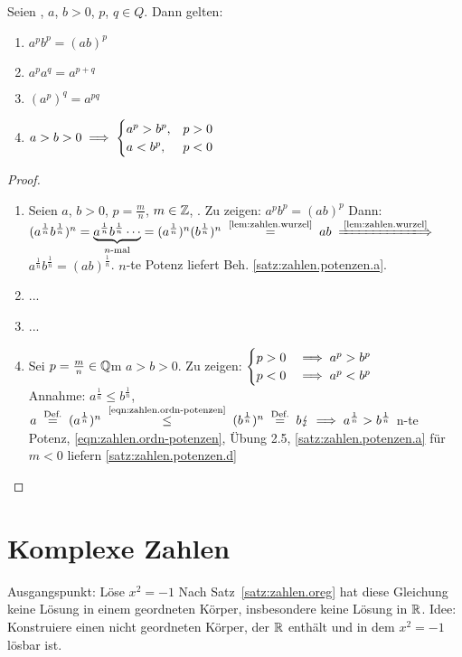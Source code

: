 \documentclass[12pt]{scrreprt}
\begin{document}
\begin{satz}\label{satz:zahlen.potenzen}
Seien , $a$, $b > 0$, $p$, $q \in {Q}$. Dann gelten:
\begin{enumerate}
\item \label{satz:zahlen.potenzen.a}
$a^p b^p = (ab)^p$
\item \label{satz:zahlen.potenzen.b}
$a^p a^q = a^{p+q}$
\item \label{satz:zahlen.potenzen.c}
$(a^p)^q = a^{pq}$
\item \label{satz:zahlen.potenzen.d}\vspace{-0.7\baselineskip}
$a>b>0 \implies \begin{cases}
a^p>b^p, &p>0\\
a<b^p, &p<0
\end{cases}$
\end{enumerate}
\end{satz}
\begin{proof}
\begin{enumerate}
\item Seien $a$, $b >0$, $p = \frac{m}{n}$, $m \in \mathbb{Z}$, .
Zu zeigen: $a^p b^p = (ab)^p$ Dann: $(a^{\frac{1}{n}}b^{\frac{1}{n}})^n =
\underbrace{a^{\frac{1}{n}}b^{\frac{1}{n}}\dotsm}_{n\text{-mal}} =
(a^{\frac{1}{n}})^n (b^{\frac{1}{n}})^n \nach{=}{\ref{lem:zahlen.wurzel}} ab \folgtnach{\ref{lem:zahlen.wurzel}} $
$a^{\frac{1}{n}}b^{\frac{1}{n}} = (ab)^{\frac{1}{n}}$. $n$-te Potenz liefert Beh. \ref{satz:zahlen.potenzen.a}.
\item ...
\item ...
\item Sei $p = \frac{m}{n} \in \mathbb{Q}$m $a>b>0$. Zu zeigen: 
$\begin{cases}
p>0 &\implies a^p > b^p\\
p<0 &\implies a^p < b^p
\end{cases}$\\
Annahme: $a^\frac{1}{n} \le b^\frac{1}{n}$, 
$a \nach{=}{Def.} (a^\frac{1}{n})^n \nach{\le}{\ref{eqn:zahlen.ordn-potenzen}} (b^\frac{1}{n})^n \nach{=}{Def.} b 
\blitz \folgt a^\frac{1}{n} > b^\frac{1}{n}$ n-te Potenz, \ref{eqn:zahlen.ordn-potenzen}, Übung 2.5, \ref{satz:zahlen.potenzen.a} 
für $m<0$ liefern \ref{satz:zahlen.potenzen.d}

\end{enumerate}
\end{proof}

\section{Komplexe Zahlen}
\label{sec:zahlen.komplex}
Ausgangspunkt: Löse $x^2 = -1$ Nach Satz~\ref{satz:zahlen.oreg} hat diese Gleichung keine Lösung in einem geordneten Körper, insbesondere
keine Lösung in $\mathbb{R}$. Idee: Konstruiere einen nicht geordneten Körper, der $\mathbb{R}$ enthält und in dem $x^2 = -1$ lösbar ist. 
\end{document}
